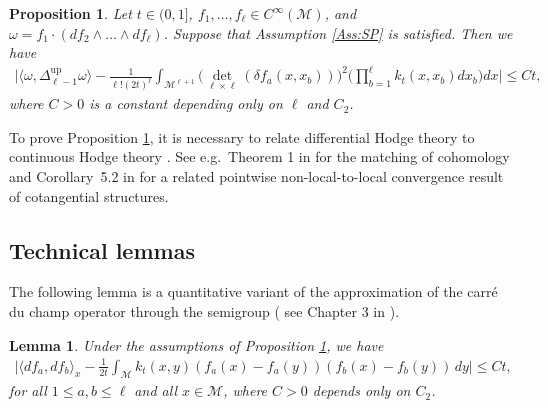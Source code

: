 \documentclass[10pt]{article}
\DeclareMathOperator{\up}{up}
\theoremstyle{plain}
\newtheorem{proposition}{Proposition}
\newtheorem{lemma}{Lemma}
\theoremstyle{definition}
\theoremstyle{remark}
\begin{document}
\begin{proposition}\label{prop:bias}
    Let $t\in(0,1]$, $f_1,\dots,f_\ell\in C^\infty(\mathcal{M})$, and $\omega=f_1\cdot(df_2\wedge\dots\wedge df_\ell)$. Suppose that Assumption \ref{Ass:SP} is satisfied. Then we have
    \begin{align*}
        \Big|\langle\omega,\Delta_{\ell-1}^{\up}\omega\rangle-\frac{1}{\ell!(2t)^\ell}\int_{\mathcal{M}^{\ell+1}}\limits\big(\det_{\ell\times\ell}( \delta f_a(x,x_b))\big)^2\Big(\prod_{b=1}^\ell k_t(x,x_b)dx_b\Big)dx\Big|\leq C t, 
    \end{align*}
    where $C>0$ is a constant depending only on $\ell$ and $C_2$. 
\end{proposition}

 To prove Proposition \ref{prop:bias}, it is necessary to relate differential Hodge theory to continuous Hodge theory \cite{Smale12,MR2876937,HK24,HinzKommer24}. See e.g.~Theorem 1 in \cite{Smale12} for the matching of cohomology and Corollary~5.2 in \cite{HinzKommer24} for a related pointwise non-local-to-local convergence result of cotangential structures.
 
\subsection{Technical lemmas}
The following lemma is a quantitative variant of the approximation of the carré du champ operator through the semigroup ( see Chapter 3 in \cite{MR3155209}). 
\begin{lemma}\label{lemma:tech:1}
    Under the assumptions of Proposition \ref{prop:bias}, we have
   \begin{align*}
            \Big|\langle df_a,df_b\rangle_x- \frac{1}{2t}\int_\mathcal{M}k_t(x,y)(f_a(x)-f_a(y))(f_b(x)-f_b(y))\,dy\Big|\leq Ct,
    \end{align*}
    for all $1\leq a,b\leq \ell$ and all $x\in\mathcal{M}$, where $C>0$ depends only on $C_2$.    
\end{lemma}
\end{document}
